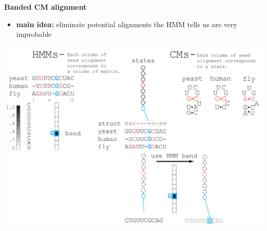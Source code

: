 \documentclass[landscape]{slides}
\begin{document}
\begin{slide}
\begin{center}
\large
\textbf{Banded CM alignment}
\end{center}
\medskip
\small
\begin{itemize}
\item
\textbf{main idea:} eliminate potential alignments the HMM tells us are very improbable
\end{itemize}
\begin{center}
\includegraphics[width=8in]{figs/post_hmm_to_cm_map2_layer13}
\end{center}
\vfill
\end{slide}
\end{document}
